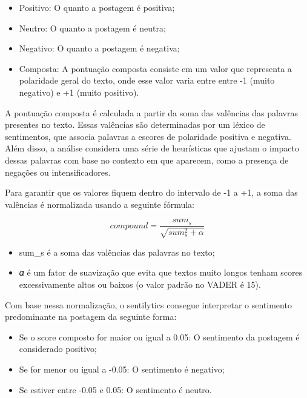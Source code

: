\documentclass[
	12pt,				%
	oneside,			%
	a4paper,			%
	english,			%
	french,				%
	spanish,			%
	brazil				%
	]{abntex2}
\begin{document}
\begin{itemize}
\tightlist
\item
  Positivo: O quanto a postagem é positiva;
\item
  Neutro: O quanto a postagem é neutra;
\item
  Negativo: O quanto a postagem é negativa;
\item
  Composta: A pontuação composta consiste em um valor que representa a
  polaridade geral do texto, onde esse valor varia entre entre -1 (muito
  negativo) e +1 (muito positivo).
\end{itemize}

A pontuação composta é calculada a partir da soma das valências das
palavras presentes no texto. Essas valências são determinadas por um
léxico de sentimentos, que associa palavras a escores de polaridade
positiva e negativa. Além disso, a análise considera uma série de
heurísticas que ajustam o impacto dessas palavras com base no contexto
em que aparecem, como a presença de negações ou intensificadores.

Para garantir que os valores fiquem dentro do intervalo de -1 a +1, a
soma das valências é normalizada usando a seguinte fórmula:

\begin{equation}
    compound = \frac{sum_s}{\sqrt{sum_s^2 + \alpha}}
\end{equation}

\begin{itemize}
\tightlist
\item
  sum\_s é a soma das valências das palavras no texto;
\item
  𝛼 é um fator de suavização que evita que textos muito longos tenham
  scores excessivamente altos ou baixos (o valor padrão no VADER é 15).
\end{itemize}

Com base nessa normalização, o sentilytics consegue interpretar o
sentimento predominante na postagem da seguinte forma:

\begin{itemize}
\tightlist
\item
  Se o score composto for maior ou igual a 0.05: O sentimento da
  postagem é considerado positivo;
\item
  Se for menor ou igual a -0.05: O sentimento é negativo;
\item
  Se estiver entre -0.05 e 0.05: O sentimento é neutro.
\end{itemize}
\end{document}
